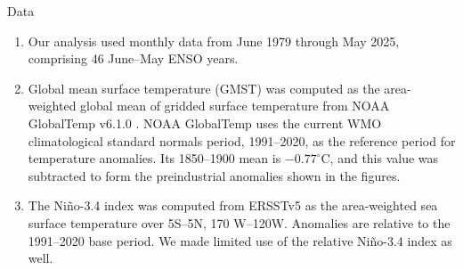\documentclass[aspectratio=169,xcolor=dvipsnames]{beamer}
\begin{document}
\begin{frame}{Data}
  \begin{enumerate}
  \item Our analysis used monthly data from June 1979 through May
    2025, comprising 46 June--May ENSO years.

  \item Global mean surface temperature (GMST) was computed as the
    area-weighted global mean of gridded surface temperature from NOAA
    GlobalTemp v6.1.0 \citep{Huang2022improvements}. NOAA GlobalTemp
    uses the current WMO climatological standard normals period,
    1991--2020, as the reference period for temperature anomalies. Its
    1850--1900 mean is $-0.77^\circ$C, and this value was subtracted
    to form the preindustrial anomalies shown in the figures.

  \item The Ni\~no-3.4 index was computed from ERSSTv5
    \citep{Huang:ERSST5} as the area-weighted sea surface temperature
    over 5\textdegree S--5\textdegree N, 170\textdegree
    W--120\textdegree W.  Anomalies are relative to the 1991--2020
    base period. We made limited use of the relative Ni\~no-3.4 index
    as well.
  
  \end{enumerate}
\end{frame}
\end{document}
